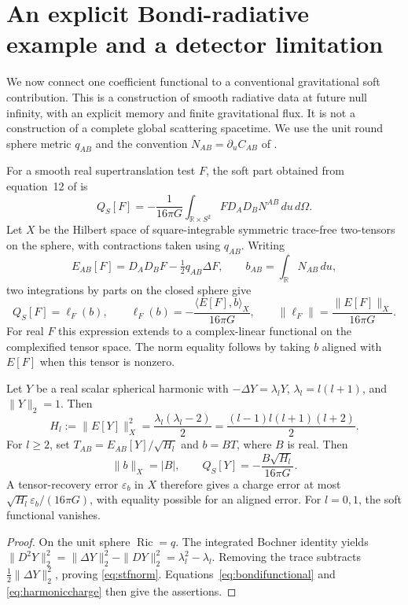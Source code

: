 \section{An explicit Bondi-radiative example and a detector limitation}
\label{sec:radiativeexample}
We now connect one coefficient functional to a conventional gravitational
soft contribution. This is a construction of smooth radiative data at
future null infinity, with an explicit memory and finite gravitational
flux. It is not a construction of a complete global scattering spacetime.
We use the unit round sphere metric $q_{AB}$ and the convention
$N_{AB}=\partial_u C_{AB}$ of \cite{pasterski}.

For a smooth real supertranslation test $F$, the soft part obtained
from equation~12 of \cite{pasterski} is
\begin{equation}\label{eq:bondisoft}
 Q_S[F]= -\frac{1}{16\pi G}\int_{\mathbb R\times S^2}
 F D_A D_B N^{AB}\,du\,d\Omega.
\end{equation}
Let $X$ be the Hilbert space of square-integrable symmetric trace-free
two-tensors on the sphere, with contractions taken using $q_{AB}$.
Writing
\[
 E_{AB}[F]=D_A D_BF-\tfrac12q_{AB}\Delta F,
 \qquad b_{AB}=\int_{\mathbb R}N_{AB}\,du,
\]
two integrations by parts on the closed sphere give
\begin{equation}\label{eq:bondifunctional}
 Q_S[F]=\ell_F(b),\qquad
 \ell_F(b)=-\frac{\langle E[F],b\rangle_X}{16\pi G},
 \qquad \|\ell_F\|=\frac{\|E[F]\|_X}{16\pi G}.
\end{equation}
For real $F$ this expression extends to a complex-linear functional on
the complexified tensor space. The norm equality follows by taking
$b$ aligned with $E[F]$ when this tensor is nonzero.

\begin{proposition}\label{prop:harmoniccharge}
Let $Y$ be a real scalar spherical harmonic with
$-\Delta Y=\lambda_lY$, $\lambda_l=l(l+1)$, and $\|Y\|_2=1$.
Then
\begin{equation}\label{eq:stfnorm}
 H_l:=\|E[Y]\|_X^2
 =\frac{\lambda_l(\lambda_l-2)}2
 =\frac{(l-1)l(l+1)(l+2)}2.
\end{equation}
For $l\ge2$, set $T_{AB}=E_{AB}[Y]/\sqrt{H_l}$ and $b=B T$,
where $B$ is real. Then
\begin{equation}\label{eq:harmoniccharge}
 \|b\|_X=|B|,\qquad Q_S[Y]= -\frac{B\sqrt{H_l}}{16\pi G}.
\end{equation}
A tensor-recovery error $\varepsilon_b$ in $X$ therefore gives a charge
error at most $\sqrt{H_l}\varepsilon_b/(16\pi G)$, with equality
possible for an aligned error. For $l=0,1$, the soft functional vanishes.
\end{proposition}
\begin{proof}
On the unit sphere $\operatorname{Ric}=q$. The integrated Bochner
identity yields
$\|D^2Y\|_2^2=\|\Delta Y\|_2^2-\|DY\|_2^2
=\lambda_l^2-\lambda_l$.
Removing the trace subtracts $\tfrac12\|\Delta Y\|_2^2$, proving
\eqref{eq:stfnorm}. Equations~\eqref{eq:bondifunctional} and
\eqref{eq:harmoniccharge} then give the assertions.
\end{proof}

